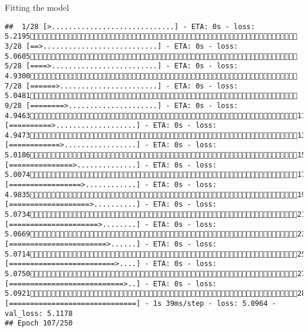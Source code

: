 \documentclass[
  ignorenonframetext,
]{beamer}
\begin{document}
\begin{frame}[fragile]{Fitting the model}
\begin{verbatim}
##  1/28 [>.............................] - ETA: 0s - loss: 5.2195 3/28 [==>...........................] - ETA: 0s - loss: 5.0605 5/28 [====>.........................] - ETA: 0s - loss: 4.9300 7/28 [======>.......................] - ETA: 0s - loss: 5.0481 9/28 [========>.....................] - ETA: 0s - loss: 4.946311/28 [==========>...................] - ETA: 0s - loss: 4.947313/28 [============>.................] - ETA: 0s - loss: 5.018615/28 [===============>..............] - ETA: 0s - loss: 5.007417/28 [=================>............] - ETA: 0s - loss: 4.983519/28 [===================>..........] - ETA: 0s - loss: 5.073421/28 [=====================>........] - ETA: 0s - loss: 5.066923/28 [=======================>......] - ETA: 0s - loss: 5.071425/28 [=========================>....] - ETA: 0s - loss: 5.075027/28 [===========================>..] - ETA: 0s - loss: 5.092128/28 [==============================] - 1s 39ms/step - loss: 5.0964 - val_loss: 5.1178
## Epoch 107/250

\end{verbatim}
\end{frame}
\end{document}
